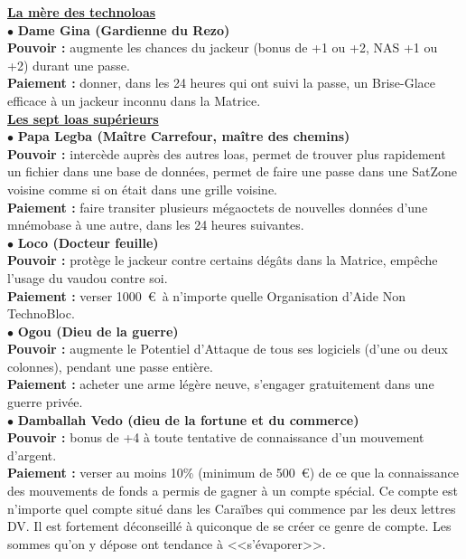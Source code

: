 \documentclass[11pt,twoside,a4paper]{article}
\begin{document}
\begin{multicols}{2}
{	\footnotesize	
	\textbf{\underline{La m{\`e}re des technoloas}}~\\ %
	$\bullet$ \textbf{Dame Gina (Gardienne du Rezo)}~\\
	\textbf{Pouvoir : }augmente les chances du jackeur (bonus de +1 ou +2, NAS +1 ou +2) durant une passe. ~\\ 
	\textbf{Paiement : }donner, dans les 24 heures qui ont suivi la passe, un Brise-Glace efficace {\`a} un jackeur inconnu dans la Matrice. ~\\
	
	\textbf{\underline{Les sept loas sup{\'e}rieurs}}~\\ %
	$\bullet$ \textbf{Papa Legba (Ma{\^i}tre Carrefour, ma{\^i}tre des chemins)}~\\
	\textbf{Pouvoir : }interc{\`e}de aupr{\`e}s des autres loas, permet de trouver plus rapidement un fichier dans une base de donn{\'e}es, permet de faire une passe dans une SatZone voisine comme si on {\'e}tait dans une grille voisine. ~\\ 
	\textbf{Paiement : }faire transiter plusieurs m{\'e}gaoctets de nouvelles donn{\'e}es d'une mn{\'e}mobase {\`a} une autre, dans les 24 heures suivantes. ~\\
	$\bullet$ \textbf{Loco (Docteur feuille)}~\\
	\textbf{Pouvoir : } prot{\`e}ge le jackeur contre certains d{\'e}g{\^a}ts dans la Matrice, emp{\^e}che l'usage du vaudou contre soi. ~\\ 
	\textbf{Paiement : } verser 1000~\euro ~{\`a} n'importe quelle Organisation d'Aide Non TechnoBloc. ~\\
	$\bullet$ \textbf{Ogou (Dieu de la guerre)}~\\
	\textbf{Pouvoir : } augmente le Potentiel d'Attaque de tous ses logiciels (d'une ou deux colonnes), pendant une passe enti{\`e}re. ~\\ 
	\textbf{Paiement : } acheter une arme l{\'e}g{\`e}re neuve, s'engager gratuitement dans une guerre priv{\'e}e. ~\\
	$\bullet$ \textbf{Damballah Vedo (dieu de la fortune et du commerce)}~\\
	\textbf{Pouvoir : } bonus de +4 {\`a} toute tentative de connaissance d'un mouvement d'argent. ~\\ 
	\textbf{Paiement : } verser au moins 10\% (minimum de 500~\euro ) de ce que la connaissance des mouvements de fonds a permis de gagner {\`a} un compte sp{\'e}cial. Ce compte est n'importe quel compte situ{\'e} dans les Cara{\"i}bes qui commence par les deux lettres DV. Il est fortement d{\'e}conseill{\'e} {\`a} quiconque de se cr{\'e}er ce genre de compte. Les sommes qu'on y d{\'e}pose ont tendance {\`a} <<s'{\'e}vaporer>>. ~\\
}
\end{multicols}
\end{document}
